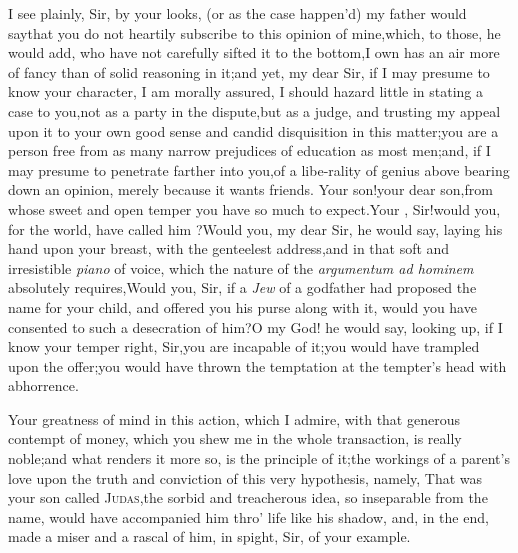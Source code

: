\documentclass{article}
\begin{document}
I see plainly, Sir, by your looks, (or as the case happen’d) my
father would say\tsk  that you do not heartily subscribe to this
opinion of mine,\tsk  which, to those, he would add, who have not
carefully sifted it to the bottom,\tsk  I own has an air more of
fancy than of solid reasoning in it;\tsh  and yet, my dear
Sir, if I may presume to know your character, I am morally assured,
I should hazard little in stating a case to you,\tsk not as a party in
the dispute,\tsk  but as a judge, and trusting my appeal upon it
to your own good sense and candid disquisition in this
matter;\tsh  you are a person free from as many narrow
prejudices of education as most men;\tsk  and, if I may presume to
penetrate farther into you,\tsk  of a libe-\pb rality of genius above
bearing down an opinion, merely because it wants friends. Your
son!\tsk  your dear son,\tsk  from whose sweet and open temper
you have so much to expect.\tsk  Your ,
Sir!\tsk  would you, for the world, have called him
?\tsk  Would you, my dear Sir, he would say,
laying his hand upon your breast, with the genteelest
address,\tsk  and in that soft and irresistible \textit{piano} of
voice, which the nature of the \textit{argumentum ad hominem}
absolutely requires,\tsk  Would you, Sir, if a \textit{Jew} of a
godfather had proposed the name for your child, and offered you his
purse along with it, would you have consented to such a desecration
of him?\tsh  O my God! he would say, looking up, if I know
your temper right, Sir,\tsk  you are incapable of
it;\tsh  you would have trampled upon the offer;\tsk\pb  you
would have thrown the temptation at the tempter’s head with
abhorrence.

Your greatness of mind in this action, which I admire, with that
generous contempt of money, which you shew me in the whole
transaction, is really noble;\tsk\break  and what renders it more so, is
the principle of it;\tsk  the workings of a parent’s love
upon the truth and conviction of this very hypothesis, namely, That
was your son called \textsc{Judas},\tsk  the sorbid and
treacherous idea, so inseparable from the name, would have
accompanied him thro’ life like his shadow, and, in the end, made
a miser and a rascal of him, in spight, Sir, of your example.
\end{document}

